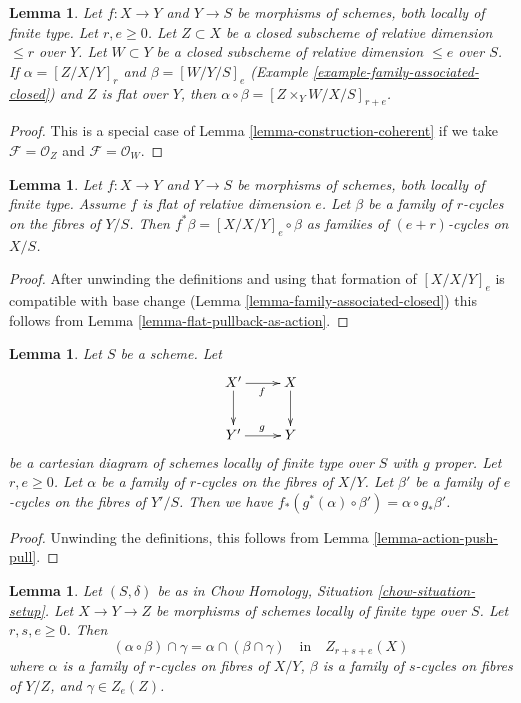\documentclass{stacks-project}
\theoremstyle{plain}
\newtheorem{lemma}[subsection]{Lemma}
\theoremstyle{definition}
\theoremstyle{remark}
\numberwithin{equation}{subsection}
\begin{document}
\begin{lemma}
\label{lemma-construction-closed}
Let $f : X \to Y$ and $Y \to S$ be morphisms of schemes, both locally of
finite type. Let $r, e \geq 0$. Let $Z \subset X$ be a closed
subscheme of relative dimension $\leq r$ over $Y$.
Let $W \subset Y$ be a closed subscheme of relative dimension $\leq e$
over $S$. If $\alpha = [Z/X/Y]_r$ and $\beta = [W/Y/S]_e$
(Example \ref{example-family-associated-closed}) and $Z$ is flat over $Y$,
then $\alpha \circ \beta = [Z \times_Y W/X/S]_{r + e}$.
\end{lemma}

\begin{proof}
This is a special case of Lemma \ref{lemma-construction-coherent}
if we take $\mathcal{F} = \mathcal{O}_Z$ and $\mathcal{F} = \mathcal{O}_W$.
\end{proof}

\begin{lemma}
\label{lemma-flat-pullback-as-composition}
Let $f : X \to Y$ and $Y \to S$ be morphisms of schemes, both locally of
finite type. Assume $f$ is flat of relative dimension $e$. Let $\beta$ be
a family of $r$-cycles on the fibres of $Y/S$. Then
$f^*\beta = [X/X/Y]_e \circ \beta$
as families of $(e + r)$-cycles on $X/S$.
\end{lemma}

\begin{proof}
After unwinding the definitions and using that formation of
$[X/X/Y]_e$ is compatible with base change
(Lemma \ref{lemma-family-associated-closed}) this follows from
Lemma \ref{lemma-flat-pullback-as-action}.
\end{proof}

\begin{lemma}
\label{lemma-construction-push-pull}
Let $S$ be a scheme. Let
$$
\xymatrix{
X' \ar[r]_f \ar[d] & X \ar[d] \\
Y' \ar[r]^g & Y
}
$$
be a cartesian diagram of schemes locally of finite type over $S$
with $g$ proper. Let $r, e \geq 0$. Let $\alpha$ be a family of
$r$-cycles on the fibres of $X/Y$. Let $\beta'$ be a family of
$e$-cycles on the fibres of $Y'/S$. Then we have
$f_*(g^*(\alpha) \circ \beta') = \alpha \circ g_*\beta'$.
\end{lemma}

\begin{proof}
Unwinding the definitions, this follows from
Lemma \ref{lemma-action-push-pull}.
\end{proof}

\begin{lemma}
\label{lemma-construction-composition}
Let $(S, \delta)$ be as in Chow Homology, Situation \ref{chow-situation-setup}.
Let $X \to Y \to Z$ be morphisms of schemes locally of finite type over $S$.
Let $r, s, e \geq 0$. Then
$$
(\alpha \circ \beta) \cap \gamma = \alpha \cap (\beta \cap \gamma)
\quad\text{in}\quad Z_{r + s + e}(X)
$$
where $\alpha$ is a family of $r$-cycles on fibres of $X/Y$,
$\beta$ is a family of $s$-cycles on fibres of $Y/Z$, and $\gamma \in Z_e(Z)$.
\end{lemma}
\end{document}
